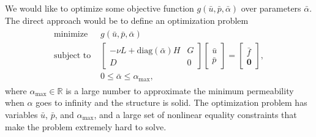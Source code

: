We would like to optimize some objective function
$g(\bar{u},\bar{p},\bar{\alpha})$ over parameters $\bar{\alpha}$. The
direct approach would be to define an optimization problem
\begin{eqnarray}
\begin{array}{ll}
  \text{minimize}     & g(\bar{u},\bar{p},\bar{\alpha})\\
  \text{subject to  } &\left[\begin{matrix} -\nu L + \text{diag} (\bar{\alpha}) H
       & G \\ D & 0
    \end{matrix} \right]
    \left[\begin{matrix}
      \bar{u} \\ \bar{p}
    \end{matrix} \right]=
    \left[\begin{matrix}
     \bar{f} \\ \mathbf{0}
    \end{matrix} \right], \\
    &0 \le \bar{\alpha} \le \alpha_{\text{max}},
\end{array}
\end{eqnarray}
where $\alpha_{\text{max}}\in \mathbb{R}$ is a large number to approximate the minimum
permeability when $\alpha$ goes to infinity and the structure is
solid. The optimization problem has variables $\bar{u}$,
$\bar{p}$, and $\alpha_{\text{max}}$, and a large set of nonlinear equality
constraints that make the problem extremely hard to solve.

